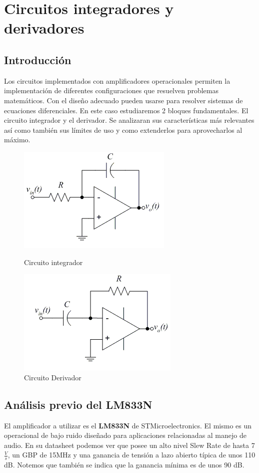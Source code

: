 \documentclass[a4paper]{article}
\begin{document}
\section{Circuitos integradores y derivadores}
\subsection{Introducción}
Los circuitos implementados con amplificadores operacionales permiten la implementación de diferentes configuraciones que resuelven problemas matemáticos. Con el diseño adecuado pueden usarse para resolver sistemas de ecuaciones diferenciales.
En este caso estudiaremos 2 bloques fundamentales. El circuito integrador y el derivador. Se analizaran sus características más relevantes así como también sus límites de uso y como extenderlos para aprovecharlos al máximo.

\begin{figure}[hbt!]
	\includegraphics[scale=1]{Ejercicio4/integrador.png}
	\caption{Circuito integrador} 
	
	\includegraphics{Ejercicio4/derivador}
	\caption{Circuito Derivador} 
	
\end{figure}

\subsection{Análisis previo del \textbf{LM833N}}
El amplificador a utilizar es el \textbf{LM833N} de STMicroelectronics. El mismo es un operacional de bajo ruido diseñado para aplicaciones relacionadas al manejo de audio.
En su datasheet podemos ver que posee un alto nivel Slew Rate de hasta 7 $\frac{V}{s}$, un GBP de 15MHz y una ganancia de tensión 
a lazo abierto típica de unos 110 dB. Notemos que también se indica que la ganancia mínima es de unos 90 dB. 
\end{document}
